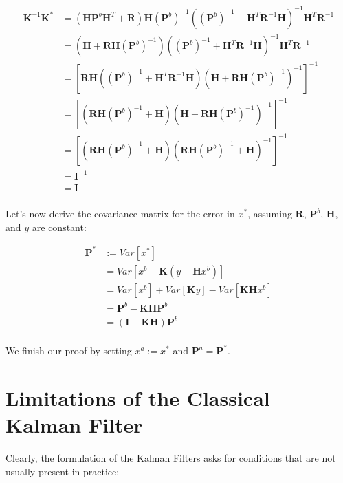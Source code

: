 \documentclass{article}
\begin{document}
\begin{align*}
\mathbf{K}^{-1} \mathbf{K}^* &= (\mathbf{H} \mathbf{P}^b \mathbf{H}^T + \mathbf{R}) \mathbf{H} (\mathbf{P}^b)^{-1} ((\mathbf{P}^b)^{-1} + \mathbf{H}^T \mathbf{R}^{-1} \mathbf{H})^{-1} \mathbf{H}^T \mathbf{R}^{-1} \\
&= (\mathbf{H} + \mathbf{R} \mathbf{H} (\mathbf{P}^b)^{-1}) ((\mathbf{P}^b)^{-1} + \mathbf{H}^T \mathbf{R}^{-1} \mathbf{H})^{-1} \mathbf{H}^T \mathbf{R}^{-1} \\
&= [\mathbf{R} \mathbf{H} ((\mathbf{P}^b)^{-1} + \mathbf{H}^T \mathbf{R}^{-1} \mathbf{H}) (\mathbf{H} + \mathbf{R} \mathbf{H} (\mathbf{P}^b)^{-1})^{-1}]^{-1} \\
&= [(\mathbf{R} \mathbf{H} (\mathbf{P}^b)^{-1} + \mathbf{H}) (\mathbf{H} + \mathbf{R} \mathbf{H} (\mathbf{P}^b)^{-1})^{-1}]^{-1} \\
&= [(\mathbf{R} \mathbf{H} (\mathbf{P}^b)^{-1} + \mathbf{H}) (\mathbf{R} \mathbf{H} (\mathbf{P}^b)^{-1} + \mathbf{H})^{-1}]^{-1} \\
&= \mathbf{I}^{-1} \\
&= \mathbf{I} \\
\end{align*}

Let's now derive the covariance matrix for the error in $x^*$, assuming $\mathbf{R}$, $\mathbf{P}^b$, $\mathbf{H}$, and $y$ are constant:

\begin{align*}
\mathbf{P}^* &:= Var[x^*] \\
&= Var[x^b + \mathbf{K}(y - \mathbf{H} x^b)] \\
&= Var[x^b] + Var[\mathbf{K}y] - Var[\mathbf{K} \mathbf{H} x^b] \\
&= \mathbf{P}^b - \mathbf{K} \mathbf{H} \mathbf{P}^b \\
&= (\mathbf{I} - \mathbf{K} \mathbf{H}) \mathbf{P}^b \\
\end{align*}

We finish our proof by setting $x^a := x^*$ and $\mathbf{P}^a = \mathbf{P}^*$. \\

\section{Limitations of the Classical Kalman Filter}

Clearly, the formulation of the Kalman Filters asks for conditions that are not usually present in practice:
\end{document}
